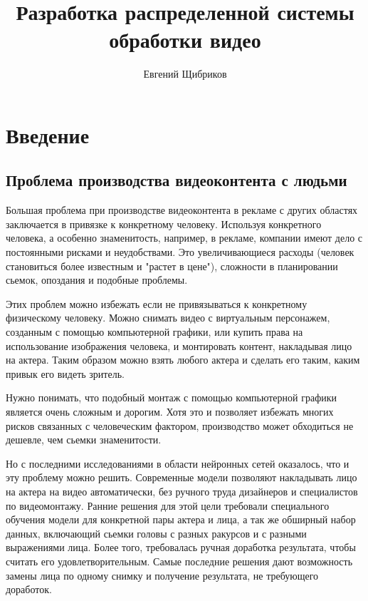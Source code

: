 

\title{Разработка распределенной системы обработки видео}
\author{Евгений Щибриков}



\tableofcontents

\newpage

\section{Введение}

\subsection{Проблема производства видеоконтента с людьми}

Большая проблема при производстве видеоконтента в рекламе с других областях заключается в привязке к конкретному человеку. Используя конкретного человека, а особенно знаменитость, например, в рекламе, компании имеют дело с постоянными рисками и неудобствами. Это увеличивающиеся расходы (человек становиться более известным и "растет в цене"), сложности в планировании сьемок, опоздания и подобные проблемы.

Этих проблем можно избежать если не привязываться к конкретному физическому человеку. Можно снимать видео с виртуальным персонажем, созданным с помощью компьютерной графики, или купить права на использование изображения человека, и монтировать контент, накладывая лицо на актера. Таким образом можно взять любого актера и сделать его таким, каким привык его видеть зритель.

Нужно понимать, что подобный монтаж с помощью компьютерной графики является очень сложным и дорогим. Хотя это и позволяет избежать многих рисков связанных с человеческим фактором, производство может обходиться не дешевле, чем сьемки знаменитости.

Но с последними исследованиями в области нейронных сетей оказалось, что и эту проблему можно решить. Современные модели позволяют накладывать лицо на актера на видео автоматически, без ручного труда дизайнеров и специалистов по видеомонтажу. Ранние решения для этой цели требовали специального обучения модели для конкретной пары актера и лица, а так же обширный набор данных, включающий сьемки головы с разных ракурсов и с разными выражениями лица. Более того, требовалась ручная доработка результата, чтобы считать его удовлетворительным. Самые последние решения дают возможность замены лица по одному снимку и получение результата, не требующего доработок.

